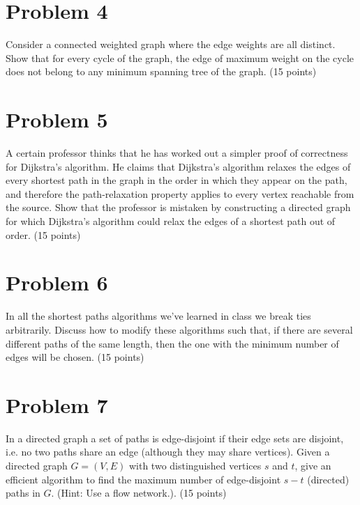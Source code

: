 \documentclass[10pt]{article}
\begin{document}
\section*{Problem 4}
Consider a connected weighted graph where the edge weights are all distinct. Show that for every cycle
of the graph, the edge of maximum weight on the cycle does not belong to any minimum spanning
tree of the graph. (15 points)

\section*{Problem 5}
A certain professor thinks that he has worked out a simpler proof of correctness for Dijkstra’s
algorithm. He claims that Dijkstra’s algorithm relaxes the edges of every shortest path in the graph in
the order in which they appear on the path, and therefore the path-relaxation property applies to every
vertex reachable from the source. Show that the professor is mistaken by constructing a directed graph
for which Dijkstra’s algorithm could relax the edges of a shortest path out of order. (15 points)

\section*{Problem 6}
In all the shortest paths algorithms we've learned in class we break ties arbitrarily. Discuss how to
modify these algorithms such that, if there are several different paths of the same length, then the one with the minimum number of edges will be chosen. (15 points)

\section*{Problem 7}
In a directed graph a set of paths is edge-disjoint if their edge sets are disjoint, i.e. no two paths share an edge (although they may share vertices). Given a directed graph $G = (V, E)$ with two distinguished vertices $s$ and $t$, give an efficient algorithm to find the maximum number of edge-disjoint $s − t$ (directed) paths in $G$. (Hint: Use a flow network.). (15 points)
\end{document}
